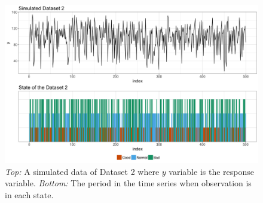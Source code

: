 \begin{figure}[H]
\begin{centering}
\includegraphics[scale=0.35]{picture/sim2}
\par\end{centering}
\caption{\emph{Top:} A simulated data of Dataset 2 where $y$ variable is the
response variable. \emph{Bottom:} The period in the time series when
observation is in each state.}
\label{sim_data2}
\end{figure}


